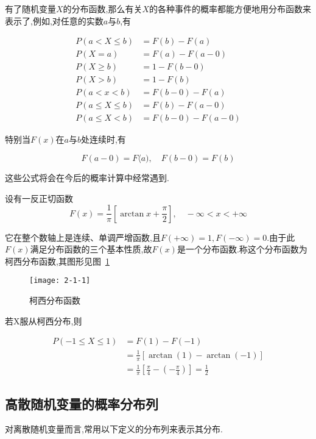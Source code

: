 有了随机变量$ X $的分布函数,那么有关$ X $的各种事件的概率都能方便地用分布函数来表示了,例如,对任意的实数$ a $与$ b $,有

\[ 
\begin{array}{ll}
P(a<X \leqslant b)&=F(b)-F(a)\\ 
P(X=a)&=F(a)-F(a-0) \\
P(X \geqslant b)&=1-F(b-0)\\
P(X>b)&=1-F(b)\\ 
P(a<x<b)&=F(b-0)-F(a)\\
P(a \leqslant X \leqslant b)&=F(b)-F(a-0)\\ 
P(a \leqslant X<b)&=F(b-0)-F(a-0)
\end{array}
\]

特别当$ F(x) $在$ a $与$ b $处连续时,有

\[ 
F(a-0)=F\langle a), \quad F(b-0)=F(b)
\]

这些公式将会在今后的概率计算中经常遇到.

\begin{example}
	设有一反正切函数
	\[ 
	F(x)=\frac{1}{\pi}\left[\arctan x+\frac{\pi}{2}\right], \quad-\infty<x<+\infty
	\]
	
	它在整个数轴上是连续、单调严增函数,且$F(+\infty)=1, F(-\infty)=0$.由于此$ F(x) $满足分布函数的三个基本性质,故$ F(x) $是一个分布函数.称这个分布函数为柯西分布函数,其图形见图~\ref{fig:2-1-1}
	
	\begin{figure}
		\centering
		\texttt{[image: 2-1-1]}
		\caption{柯西分布函数}
		\label{fig:2-1-1}
	\end{figure}
	
	若X服从柯西分布,则
	
	\[ 
	\begin{aligned} P(-1 \leqslant X \leqslant 1) &=F(1)-F(-1) \\ &=\frac{1}{\pi}[\arctan (1)-\arctan (-1)] \\ &=\frac{1}{\pi}\left[\frac{\pi}{4}-\left(-\frac{\pi}{4}\right)\right]=\frac{1}{2} \end{aligned}
	\]
	
\end{example}

\subsection{高散随机变量的概率分布列}

对离散随机变量而言,常用以下定义的分布列来表示其分布.

